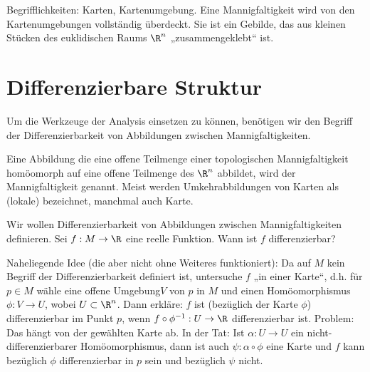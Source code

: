 Begrifflichkeiten: Karten, Kartenumgebung.
Eine Mannigfaltigkeit wird von den Kartenumgebungen vollständig überdeckt.
Sie ist ein Gebilde, das aus kleinen Stücken des euklidischen Raums $\R^n$ „zusammengeklebt“ ist.


\section{Differenzierbare Struktur}

Um die Werkzeuge der Analysis einsetzen zu können, benötigen wir den Begriff der Differenzierbarkeit von Abbildungen zwischen Mannigfaltigkeiten.

\begin{df} \label{1.5}
    Eine Abbildung die eine offene Teilmenge einer topologischen Mannigfaltigkeit homöomorph auf eine offene Teilmenge des $\R^n$ abbildet, wird  der Mannigfaltigkeit genannt.
    Meist werden Umkehrabbildungen von Karten als (lokale)  bezeichnet, manchmal auch Karte.
\end{df}

Wir wollen Differenzierbarkeit von Abbildungen zwischen Mannigfaltigkeiten definieren.
Sei $f: M \to \R$ eine reelle Funktion.
Wann ist $f$ differenzierbar?

Naheliegende Idee (die aber nicht ohne Weiteres funktioniert):
Da auf $M$ kein Begriff der Differenzierbarkeit definiert ist, untersuche $f$ „in einer Karte“, d.h. für $p \in M$ wähle eine offene Umgebung$V$ von $p$ in $M$ und einen Homöomorphismus $\phi: V \to U$, wobei $U \subset \R^n$.
Dann erkläre: $f$ ist (bezüglich der Karte $\phi$) differenzierbar im Punkt $p$, wenn
\begin{math}
    f \circ \phi^{-1}: U \to \R
\end{math}
differenzierbar ist.
Problem: Das hängt von der gewählten Karte ab.
In der Tat: Ist $\alpha: U \to U$ ein nicht-differenzierbarer Homöomorphismus, dann ist auch $\psi: \alpha \circ \phi$ eine Karte und $f$ kann bezüglich $\phi$ differenzierbar in $p$ sein und bezüglich $\psi$ nicht.


